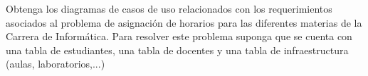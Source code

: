 Obtenga los diagramas de casos de uso relacionados con los requerimientos asociados al problema de asignación de horarios para las diferentes materias de la Carrera de Informática. Para resolver este problema suponga que se cuenta con una tabla de estudiantes, una tabla de docentes y una tabla de infraestructura (aulas, laboratorios,...)
